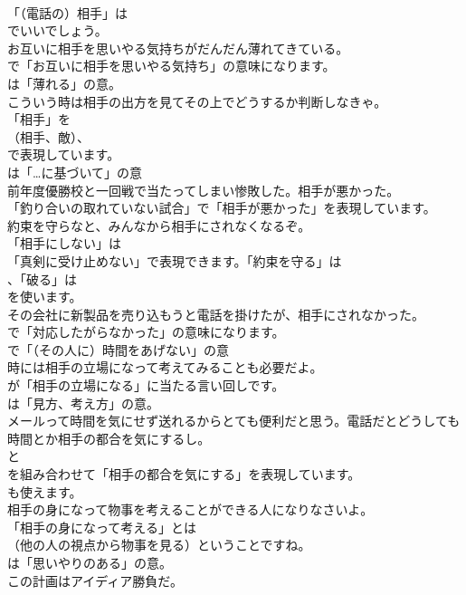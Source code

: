 \documentclass[8pt]{extreport}
\begin{document}
\begin{CJK}{UTF8}{min}
\\	「（電話の）相手」は 
\\	でいいでしょう。	
\\	お互いに相手を思いやる気持ちがだんだん薄れてきている。 
\\	で「お互いに相手を思いやる気持ち」の意味になります。
\\	は「薄れる」の意。	
\\	こういう時は相手の出方を見てその上でどうするか判断しなきゃ。 
\\	「相手」を 
\\	（相手、敵）、
\\	で表現しています。
\\	は「…に基づいて」の意	
\\	前年度優勝校と一回戦で当たってしまい惨敗した。相手が悪かった。 
\\	「釣り合いの取れていない試合」で「相手が悪かった」を表現しています。	
\\	約束を守らなと、みんなから相手にされなくなるぞ。 
\\	「相手にしない」は
\\	「真剣に受け止めない」で表現できます。「約束を守る」は
\\	、「破る」は
\\	を使います。	
\\	その会社に新製品を売り込もうと電話を掛けたが、相手にされなかった。 
\\	で「対応したがらなかった」の意味になります。
\\	で「（その人に）時間をあげない」の意	
\\	時には相手の立場になって考えてみることも必要だよ。 
\\	が「相手の立場になる」に当たる言い回しです。
\\	は「見方、考え方」の意。	
\\	メールって時間を気にせず送れるからとても便利だと思う。電話だとどうしても時間とか相手の都合を気にするし。 
\\	と 
\\	を組み合わせて「相手の都合を気にする」を表現しています。
\\	も使えます。	
\\	相手の身になって物事を考えることができる人になりなさいよ。 
\\	「相手の身になって考える」とは
\\	（他の人の視点から物事を見る）ということですね。
\\	は「思いやりのある」の意。	
\\	この計画はアイディア勝負だ。 

\end{CJK}
\end{document}

